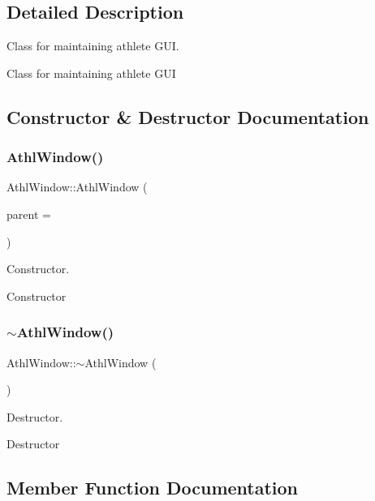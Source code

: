 \subsection{Detailed Description}
Class for maintaining athlete G\+UI. 

Class for maintaining athlete G\+UI 

\subsection{Constructor \& Destructor Documentation}
\mbox{\label{classAthlWindow_a5302bd0bf15527d2381b7847ed15c59b}} 
\subsubsection{\texorpdfstring{AthlWindow()}{AthlWindow()}}
{\footnotesize\ttfamily Athl\+Window\+::\+Athl\+Window (\begin{DoxyParamCaption}\item[{Q\+Widget $\ast$}]{parent = {} }\end{DoxyParamCaption})\hspace{0.3cm}{\ttfamily [explicit]}}



Constructor. 

Constructor \mbox{\label{classAthlWindow_a2e01043c83916e0453e20770cf8993ca}} 
\subsubsection{\texorpdfstring{$\sim$AthlWindow()}{~AthlWindow()}}
{\footnotesize\ttfamily Athl\+Window\+::$\sim$\+Athl\+Window (\begin{DoxyParamCaption}{ }\end{DoxyParamCaption})}



Destructor. 

Destructor 

\subsection{Member Function Documentation}
\mbox{\label{classAthlWindow_a2764b50cbd347e717eb642bf65b2d559}} 
